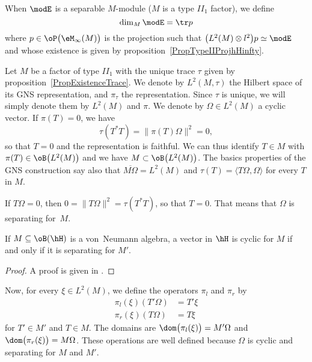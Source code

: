 When $\modE$ is a separable $M$-module ($M$ is a type $II_1$ factor), we define
\begin{equation}
	\dim_M\modE=\tr p
\end{equation}
where $p\in\oP\big( \eM_{\infty}(M) \big)$ is the projection such that $\big( L^2(M)\otimes l^2 \big)p\simeq \modE$ and whose existence is given by proposition~\ref{PropTypeIIProjhHinfty}.

Let $M$ be a factor of type $II_1$ with the unique trace $\tau$ given by proposition~\ref{PropExistenceTrace}. We denote by $L^2(M,\tau)$ the Hilbert space of its GNS representation, and $\pi_{\tau}$ the representation. Since $\tau$ is unique, we will simply denote them by $L^2(M)$ and $\pi$. We denote by $\Omega\in L^2(M)$ a cyclic vector. If $\pi(T)=0$, we have
\[
	\tau(T^*T)=\| \pi(T)\Omega \|^2=0,
\]
so that $T=0$ and the representation is faithful. We can thus identify $T\in M$ with $\pi(T)\in \oB\big( L^2(M) \big)$ and we have $M\subset\oB\big( L^2(M) \big)$. The basics properties of the GNS construction say also that $\overline{ M\Omega }=L^2(M)$ and $\tau(T)=\langle T\Omega, \Omega\rangle $ for every $T$ in $M$.

If $T\Omega=0$, then $0=\| T\Omega \|^2=\tau(T^*T)$, so that $T=0$. That means that $\Omega$ is separating for~$M$.

\begin{lemma}
	If $M\subseteq\oB(\hH)$ is a von~Neumann algebra, a vector in $\hH$ is cyclic for $M$ if and only if it is separating for $M'$.
\end{lemma}
\begin{proof}
	A proof is given in \cite{JonesSunder}.
\end{proof}

Now, for every $\xi\in L^2(M)$, we define the operators $\pi_l$ and $\pi_r$ by
\begin{subequations}
	\begin{align}
		\pi_l(\xi)(T'\Omega) & = T'\xi \\
		\pi_r(\xi)(T\Omega)  & = T\xi
	\end{align}
\end{subequations}
for $T'\in M'$ and $T\in M$. The domains are $\dom\big( \pi_l(\xi) \big)=M'\Omega$ and $\dom\big( \pi_r(\xi) \big)=M\Omega$. These operations are well defined because $\Omega$ is cyclic and separating for $M$ and $M'$.

